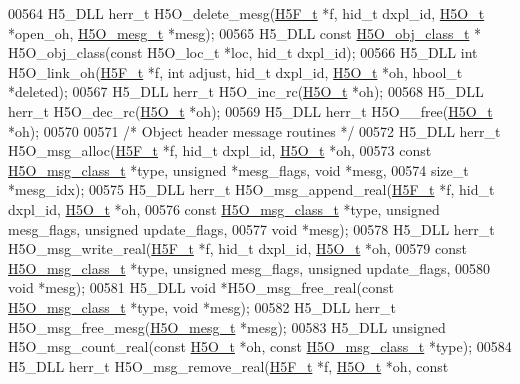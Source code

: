 \begin{DoxyCode}
00564 H5\_DLL herr\_t H5O\_delete\_mesg(\hyperlink{struct_h5_f__t}{H5F\_t} *f, hid\_t dxpl\_id, \hyperlink{struct_h5_o__t}{H5O\_t} *open\_oh, 
      \hyperlink{struct_h5_o__mesg__t}{H5O\_mesg\_t} *mesg);
00565 H5\_DLL \textcolor{keyword}{const} \hyperlink{struct_h5_o__obj__class__t}{H5O\_obj\_class\_t} * H5O\_obj\_class(\textcolor{keyword}{const} H5O\_loc\_t *loc, hid\_t dxpl\_id);
00566 H5\_DLL \textcolor{keywordtype}{int} H5O\_link\_oh(\hyperlink{struct_h5_f__t}{H5F\_t} *f, \textcolor{keywordtype}{int} adjust, hid\_t dxpl\_id, \hyperlink{struct_h5_o__t}{H5O\_t} *oh, hbool\_t *deleted);
00567 H5\_DLL herr\_t H5O\_inc\_rc(\hyperlink{struct_h5_o__t}{H5O\_t} *oh);
00568 H5\_DLL herr\_t H5O\_dec\_rc(\hyperlink{struct_h5_o__t}{H5O\_t} *oh);
00569 H5\_DLL herr\_t H5O\_\_free(\hyperlink{struct_h5_o__t}{H5O\_t} *oh);
00570 
00571 \textcolor{comment}{/* Object header message routines */}
00572 H5\_DLL herr\_t H5O\_msg\_alloc(\hyperlink{struct_h5_f__t}{H5F\_t} *f, hid\_t dxpl\_id, \hyperlink{struct_h5_o__t}{H5O\_t} *oh,
00573     \textcolor{keyword}{const} \hyperlink{struct_h5_o__msg__class__t}{H5O\_msg\_class\_t} *type, \textcolor{keywordtype}{unsigned} *mesg\_flags, \textcolor{keywordtype}{void} *mesg,
00574     \textcolor{keywordtype}{size\_t} *mesg\_idx);
00575 H5\_DLL herr\_t H5O\_msg\_append\_real(\hyperlink{struct_h5_f__t}{H5F\_t} *f, hid\_t dxpl\_id, \hyperlink{struct_h5_o__t}{H5O\_t} *oh,
00576     \textcolor{keyword}{const} \hyperlink{struct_h5_o__msg__class__t}{H5O\_msg\_class\_t} *type, \textcolor{keywordtype}{unsigned} mesg\_flags, \textcolor{keywordtype}{unsigned} update\_flags,
00577     \textcolor{keywordtype}{void} *mesg);
00578 H5\_DLL herr\_t H5O\_msg\_write\_real(\hyperlink{struct_h5_f__t}{H5F\_t} *f, hid\_t dxpl\_id, \hyperlink{struct_h5_o__t}{H5O\_t} *oh,
00579     \textcolor{keyword}{const} \hyperlink{struct_h5_o__msg__class__t}{H5O\_msg\_class\_t} *type, \textcolor{keywordtype}{unsigned} mesg\_flags, \textcolor{keywordtype}{unsigned} update\_flags,
00580     \textcolor{keywordtype}{void} *mesg);
00581 H5\_DLL \textcolor{keywordtype}{void} *H5O\_msg\_free\_real(\textcolor{keyword}{const} \hyperlink{struct_h5_o__msg__class__t}{H5O\_msg\_class\_t} *type, \textcolor{keywordtype}{void} *mesg);
00582 H5\_DLL herr\_t H5O\_msg\_free\_mesg(\hyperlink{struct_h5_o__mesg__t}{H5O\_mesg\_t} *mesg);
00583 H5\_DLL \textcolor{keywordtype}{unsigned} H5O\_msg\_count\_real(\textcolor{keyword}{const} \hyperlink{struct_h5_o__t}{H5O\_t} *oh, \textcolor{keyword}{const} \hyperlink{struct_h5_o__msg__class__t}{H5O\_msg\_class\_t} *type);
00584 H5\_DLL herr\_t H5O\_msg\_remove\_real(\hyperlink{struct_h5_f__t}{H5F\_t} *f, \hyperlink{struct_h5_o__t}{H5O\_t} *oh, \textcolor{keyword}{const} 

\end{DoxyCode}
